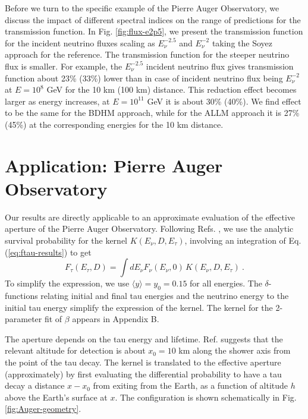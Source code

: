 \documentclass[aps,10pt,twocolumn,tightenlines]{revtex4-1}
\begin{document}
Before we turn to the specific example of the Pierre
Auger Observatory, we discuss the impact of different spectral indices on the range of predictions for the transmission function.
In Fig. \ref{fig:flux-e2p5}, we present the transmission function for the incident neutrino fluxes 
scaling as $E_\nu^{-2.5}$ and $E_\nu^{-2}$  taking the Soyez approach for the reference. 
The transmission function for the steeper neutrino flux is smaller.  For example, the $E_\nu^{-2.5}$ incident neutrino flux gives transmission function 
 about 23\% (33\%) lower than in case of incident neutrino flux being 
$E_\nu^{-2}$ at $E=10^8$ GeV for the 10 km (100 km) distance.
This reduction effect becomes larger as energy increases, 
 at $E=10^{11}$ GeV it is about 30\% (40\%).  
We find effect to be the same for the BDHM approach, 
while for the ALLM approach it is 27\% (45\%) at the corresponding energies for the 10 km distance.


\section{Application: Pierre Auger Observatory}

Our results are directly applicable to an approximate evaluation of the effective aperture of the Pierre Auger Observatory. Following Refs. \cite{Aramo:2004pr,Miele:2005bt,Abraham:2009uy}, we use the analytic survival probability for the 
kernel $K(E_\nu,D,E_\tau)$, involving an integration of Eq. (\ref{eq:ftau-results}) to get
\begin{equation}
F_\tau(E_\tau, D) = \int dE_\nu F_\nu(E_\nu,0) \, K(E_\nu, D, E_\tau)\ .
\end{equation}
To simplify the expression, we use $\langle y\rangle = y_0=0.15$ for all energies. The $\delta$-functions relating initial and final tau energies and the neutrino energy to the initial tau energy simplify the expression of the kernel. The kernel for the 2-parameter fit of $\beta$ appears in Appendix B.

The aperture depends on the tau energy and lifetime. Ref. \cite{Abraham:2009uy} suggests that the relevant altitude
for detection is about $x_0=10$ km along the shower axis from the point of the tau decay. 
The kernel is translated to the effective aperture (approximately) by first evaluating the differential probability to 
have a tau decay a distance $x-x_0$ from exiting from the Earth, as a function of altitude $h$ above the Earth's surface at
$x$. The configuration is shown schematically in Fig. \ref{fig:Auger-geometry}.
\end{document}
